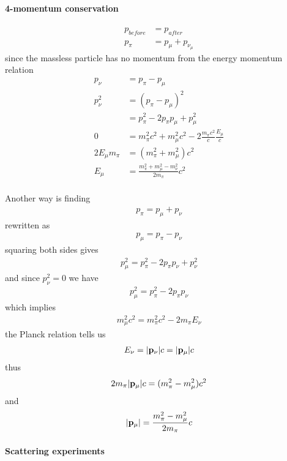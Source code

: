 \documentclass[../main.tex]{subfiles}
\begin{document}
\paragraph{4-momentum conservation}
\begin{align*}
    p_{before} &= p_{after} \\
    p_{\pi} &= p_{\mu} + p_{\nu_\mu}
\end{align*}
since the massless particle has no momentum from the energy momentum relation
\begin{align*}
    p_\nu &= p_\pi - p_\mu \\
    p_\nu^2 &= (p_\pi - p_\mu)^2 \\
    &= p_\pi^2 - 2p_\pi p_\mu + p_\mu^2 \\
    0 &= m_\pi^2 c^2 + m_\mu^2 c^2 - 2\frac{m_\pi c^2}{c} \frac{E_\mu}{c} \\
    2E_\mu m_\pi &= (m_\pi^2 + m_\mu^2) c^2 \\
    E_\mu &= \frac{m_\pi^2 + m_\mu^2 - m_\nu^2}{2m_\pi} c^2 \\
\end{align*}

Another way is finding
\begin{align*}
    p_\pi = p_\mu + p_\nu
\end{align*}
rewritten as
\begin{align*}
    p_\mu = p_\pi - p_\nu
\end{align*}
squaring both sides gives
\begin{align*}
    p_\mu^2 = p_\pi^2 - 2p_\pi p_\nu + p_\nu^2
\end{align*}
and since $p_\nu^2 = 0$ we have
\begin{align*}
    p_\mu^2 = p_\pi^2 - 2p_\pi p_\nu
\end{align*}
which implies
\begin{align*}
    m_\mu^2 c^2 = m_\pi^2 c^2 - 2m_\pi E_\nu
\end{align*}
the Planck relation tells us
\begin{align*}
    E_\nu = \abs{\vb{p}_\nu} c = \abs{\vb{p}_\mu} c
\end{align*}
thus
\begin{align*}
    2 m_\pi \abs{\vb{p}_\mu} c = (m_\pi^2 - m_\mu^2) c^2
\end{align*}
and
\begin{align*}
    \abs{\vb{p}_\mu} = \frac{m_\pi^2 - m_\mu^2}{2m_\pi} c
\end{align*}

\paragraph{Scattering experiments}
\end{document}

